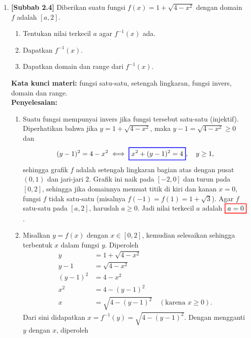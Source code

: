 \documentclass[10pt,openany,a4paper]{article}
\theoremstyle{definition}
\theoremstyle{definition}
\theoremstyle{plain}
\newenvironment{jawab}[2][tes]{%
\par\noindent\textbf{Kata kunci materi:} #1.\\
\textbf{Penyelesaian:} #2%
}{}
\begin{document}
\begin{enumerate}
    \item \textbf{[Subbab 2.4]} Diberikan suatu fungsi $f(x)=1+\sqrt{4-x^2}$ dengan domain $f$ adalah $[a,2]$.
    \begin{enumerate}
        \item Tentukan nilai terkecil $a$ agar $f^{-1}(x)$ ada.
        \item Dapatkan $f^{-1}(x)$.
        \item Dapatkan domain dan range dari $f^{-1}(x)$.
    \end{enumerate}
    \begin{jawab}[fungsi satu-satu, setengah lingkaran, fungsi invers, domain dan range]{
        \begin{enumerate}
            \item Suatu fungsi mempunyai invers jika fungsi tersebut satu-satu (injektif). Diperhatikan bahwa jika $y=1+\sqrt{4-x^2}$, maka $y-1=\sqrt{4-x^2}\geq 0$ dan
            \begin{align*}
                (y-1)^2 = 4-x^2 \iff \colorlet{oldcolor}{.}
        \color{blue}
        \setlength{\fboxrule}{1pt} \boxed{\color{oldcolor}x^2+(y-1)^2=4}\color{oldcolor},\quad y\geq 1,
            \end{align*}
            sehingga grafik $f$ adalah setengah lingkaran bagian atas dengan pusat $(0,1)$ dan jari-jari $2$. Grafik ini naik pada $[-2,0]$ dan turun pada $[0,2]$, sehingga jika domainnya memuat titik di kiri dan kanan $x=0$, fungsi $f$ tidak satu-satu (misalnya $f(-1)=f(1)=1+\sqrt{3}$). Agar $f$ satu-satu pada $[a,2]$, haruslah $a\geq 0$. Jadi nilai terkecil $a$ adalah $\colorlet{oldcolor}{.}
        \color{red}
        \setlength{\fboxrule}{1pt} \boxed{\color{oldcolor}a=0}\color{oldcolor}$.
            \item Misalkan $y=f(x)$ dengan $x\in[0,2]$, kemudian selesaikan sehingga terbentuk $x$ dalam fungsi $y$. Diperoleh
            \begin{align*}
                y &= 1+\sqrt{4-x^2}\\
                y-1 &= \sqrt{4-x^2}\\
                (y-1)^2 &= 4-x^2\\
                x^2 &= 4-(y-1)^2\\
                x &= \sqrt{4-(y-1)^2} \quad (\text{karena } x\geq 0).
            \end{align*}
            Dari sini didapatkan $x = f^{-1}(y) = \sqrt{4-(y-1)^2}$. Dengan mengganti $y$ dengan $x$, diperoleh
            \begin{align*}

\end{align*}
\end{enumerate}}
\end{jawab}
\end{enumerate}
\end{document}
